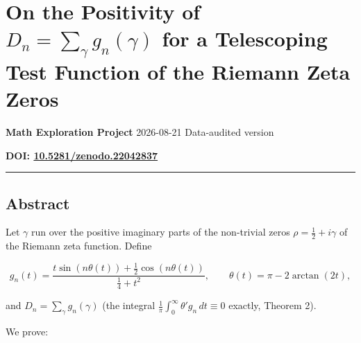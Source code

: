 \documentclass[
]{article}
\author{}
\date{}
\begin{document}
\hypertarget{on-the-positivity-of-d_n-sum_gamma-g_ngamma-for-a-telescoping-test-function-of-the-riemann-zeta-zeros}{%
\section{\texorpdfstring{On the Positivity of
\(D_n = \sum_\gamma g_n(\gamma)\) for a Telescoping Test Function of the
Riemann Zeta
Zeros}{On the Positivity of D\_n = \textbackslash sum\_\textbackslash gamma g\_n(\textbackslash gamma) for a Telescoping Test Function of the Riemann Zeta Zeros}}\label{on-the-positivity-of-d_n-sum_gamma-g_ngamma-for-a-telescoping-test-function-of-the-riemann-zeta-zeros}}

\textbf{Math Exploration Project} \textbar{} 2026-08-21 \textbar{}
Data-audited version

\textbf{DOI:
\href{https://doi.org/10.5281/zenodo.22042837}{10.5281/zenodo.22042837}}

\begin{center}\rule{0.5\linewidth}{0.5pt}\end{center}

\hypertarget{abstract}{%
\subsection{Abstract}\label{abstract}}

Let \(\gamma\) run over the positive imaginary parts of the non-trivial
zeros \(\rho = \tfrac12+i\gamma\) of the Riemann zeta function. Define

\[g_n(t) = \frac{t\sin(n\theta(t)) + \tfrac12\cos(n\theta(t))}{\tfrac14 + t^2}, \qquad \theta(t) = \pi - 2\arctan(2t),\]

and \(D_n = \sum_\gamma g_n(\gamma)\) (the integral
\(\frac1\pi\int_0^\infty\theta'g_n\,dt \equiv 0\) exactly, Theorem 2).

We prove:
\end{document}
